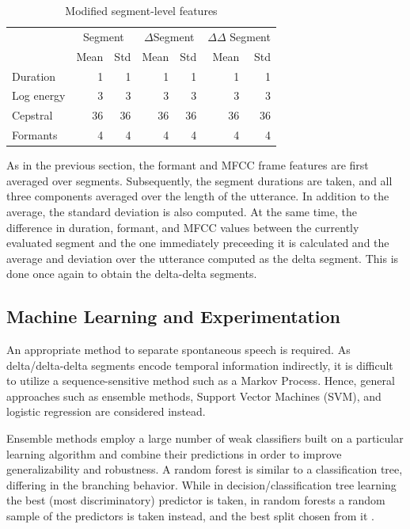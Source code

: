 \documentclass[conference]{IEEEtran}
\begin{document}
\begin{table}[!htb]
\renewcommand{\arraystretch}{1.3}
\caption{Modified segment-level features}
\label{seg_feats}
\centering
\begin{tabular}{l|r|r|r|r|r|r|}
    \cline{2-7}
    {} & \multicolumn{2}{|c|}{Segment}
    & \multicolumn{2}{|c|}{$\Delta$Segment}
    & \multicolumn{2}{|c|}{$\Delta\Delta$ Segment} \\
    \cline{2-7}
    {} & Mean & Std & Mean & Std & Mean & Std \\
    \hline
    \multicolumn{1}{|l|}{Duration} & 1 & 1 & 1 & 1 & 1 & 1 \\
    \hline
    \multicolumn{1}{|l|}{Log energy} & 3 & 3 & 3 & 3 & 3 & 3 \\
    \hline
    
    \multicolumn{1}{|l|}{Cepstral} & 36 & 36 & 36 & 36 & 36 & 36 \\
    \hline
    \multicolumn{1}{|l|}{Formants} & 4 & 4 & 4 & 4 & 4 & 4 \\
    \hline
\end{tabular}
\end{table}

As in the previous section, the formant and MFCC frame features are first averaged over segments.
Subsequently, the segment durations are taken, and all three components averaged over the length of the utterance.
In addition to the average, the standard deviation is also computed.
At the same time, the difference in duration, formant, and MFCC values between the currently evaluated segment and the one immediately preceeding it is calculated and the average and deviation over the utterance computed as the delta segment.
This is done once again to obtain the delta-delta segments.

\subsection{Machine Learning and Experimentation}

An appropriate method to separate spontaneous speech is required.
As delta/delta-delta segments encode temporal information indirectly, it is difficult to utilize a sequence-sensitive method such as a Markov Process.
Hence, general approaches such as ensemble methods, Support Vector Machines (SVM), and logistic regression are considered instead.

Ensemble methods employ a large number of weak classifiers built on a particular learning algorithm and combine their predictions in order to improve generalizability and robustness.
A random forest is similar to a classification tree, differing in the branching behavior.
While in decision/classification tree learning the best (most discriminatory) predictor is taken, in random forests a random sample of the predictors is taken instead, and the best split chosen from it \cite{liaw}.
\end{document}
